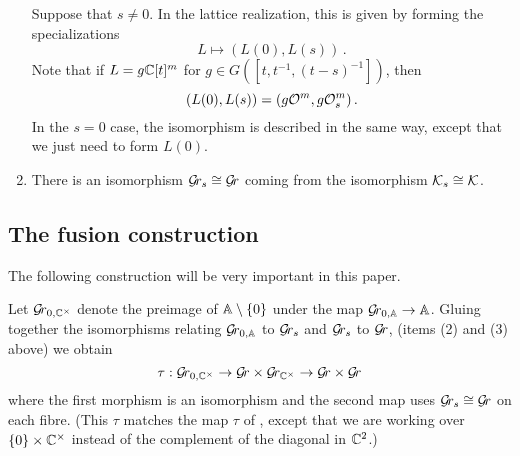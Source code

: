 \documentclass[draft]{article}
\begin{document}
\begin{enumerate}
    Suppose that $ s \ne 0 $.  In the lattice realization, this is given by forming the specializations 
    $$
    L \mapsto (L(0), L(s))\,.
    $$
    Note that if $ L = g \CC[t]^m$ for $ g \in G([t,t^{-1}, (t-s)^{-1}])$, then 
    $$
        (L(0), L(s)) = (g \cO^m, g\cO^m_s)\,. 
    $$
% 
% 
% 
% 
    In the $ s = 0 $ case, the isomorphism is described in the same way, except that we just need to form $ L(0)$.
    \item There is an isomorphism $ \Gr_s \cong \Gr $ coming from the isomorphism $ \Ks \cong \cK$. 
\end{enumerate}

\subsection{The fusion construction}
The following construction will be very important in this paper.  

Let $ \Gr_{0, \CC^\times} $ denote the preimage of $\AA \setminus \{0\}$ under the map $\Gr_{0,\AA} \rightarrow \AA $.  Gluing together the isomorphisms relating $\Grbd$ to $\Gr_s$ and $\Gr_s$ to $\Gr$, (items (2) and (3) above) we obtain
$$
\tau : \Gr_{0, \CC^\times} \rightarrow \Gr \times \Gr_{\CC^\times} \rightarrow \Gr \times \Gr
$$
where the first morphism is an isomorphism and the second map uses $ \Gr_s \cong \Gr $ on each fibre.  (This $\tau$ matches the map $ \tau $ of \cite{mirkovic2007geometric}, except that we are working over $ \{0 \} \times \CC^\times$ instead of the complement of the diagonal in $ \CC^2 $.)
\end{document}
